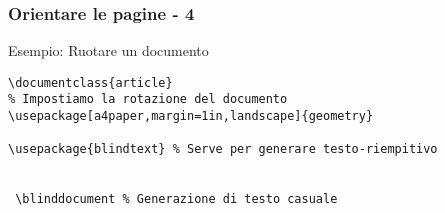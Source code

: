 \begin{frame}[fragile]
 \frametitle{Orientare le pagine - 4}
  \begin{exampleblock}{Esempio: Ruotare un documento}
\begin{code}
\begin{verbatim}
\documentclass{article}
% Impostiamo la rotazione del documento
\usepackage[a4paper,margin=1in,landscape]{geometry}

\usepackage{blindtext} % Serve per generare testo-riempitivo


 \blinddocument % Generazione di testo casuale

\end{verbatim}
  \end{code}
 \end{exampleblock}
\end{frame}
